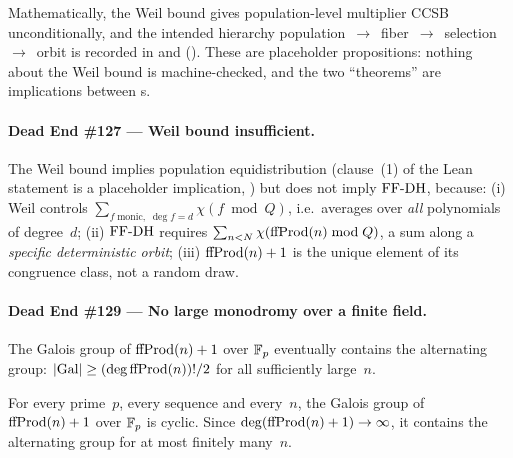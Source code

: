 \begin{remark}
Mathematically, the Weil bound gives population-level multiplier CCSB
unconditionally, and the intended hierarchy
population~$\to$~fiber~$\to$~selection~$\to$~orbit is recorded in
 and
 ().
These are placeholder propositions: nothing about the Weil bound is
machine-checked, and the two ``theorems'' are implications between
s.
\end{remark}

\paragraph{Dead End \#127 --- Weil bound insufficient.}

\begin{theorem}
\label{thm:de127}
The Weil bound implies population equidistribution (clause~(1) of the
Lean statement is a placeholder implication, \placeholder) but does not
imply $\mathrm{FF\text{-}DH}$, because:
(i) Weil controls $\sum_{f\;\mathrm{monic},\;\deg f = d}\chi(f \bmod Q)$,
i.e.\ averages over \emph{all} polynomials of degree~$d$;
(ii) $\mathrm{FF\text{-}DH}$ requires $\sum_{n<N}\chi(\mathrm{ffProd}(n) \bmod Q)$, a sum along
a \emph{specific deterministic orbit};
(iii) $\mathrm{ffProd}(n)+1$ is the unique element of its congruence class, not
a random draw.
\end{theorem}

\paragraph{Dead End \#129 --- No large monodromy over a finite field.}

\begin{property}
The Galois group of $\mathrm{ffProd}(n)+1$ over $\mathbb{F}_p$ eventually contains the
alternating group: $|\mathrm{Gal}| \geq (\deg \mathrm{ffProd}(n))!/2$ for all
sufficiently large~$n$.
\end{property}

\begin{theorem}
\label{thm:de129}
For every prime~$p$, every sequence and every~$n$, the Galois group of
$\mathrm{ffProd}(n)+1$ over $\mathbb{F}_p$ is cyclic.  Since
$\deg(\mathrm{ffProd}(n)+1) \to \infty$, it contains the alternating group for
at most finitely many~$n$.
\end{theorem}

